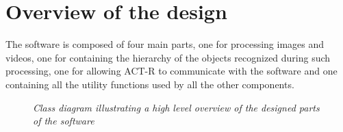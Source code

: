 	\section{Overview of the design}
	The software is composed of four main parts, one for processing images and videos, one for containing the hierarchy of the objects recognized during such processing, one for allowing ACT-R to communicate with the software and one containing all the utility functions used by all the other components.

	\begin{figure}[h]
	  \begin{center} 
	  \end{center} 
	  \caption{\textit{Class diagram illustrating a high level overview of the designed parts of the software}}  
	  \label{fig:swArchitecture}
 	\end{figure}		

